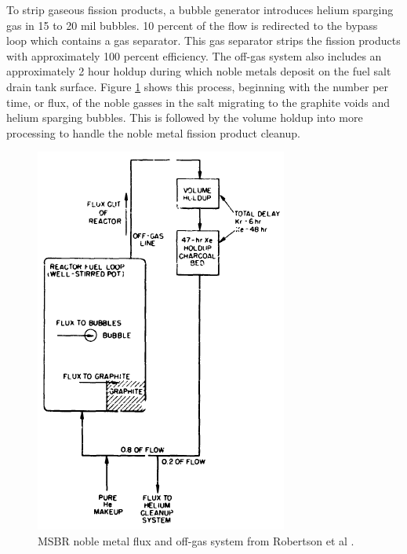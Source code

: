 To strip gaseous fission products, a bubble generator introduces helium sparging gas in 15 to 20 mil bubbles. 10 percent of the flow is redirected to the bypass loop which contains a gas separator. This gas separator strips the fission products with approximately 100 percent efficiency. The off-gas system also includes an approximately 2 hour holdup during which noble metals deposit on the fuel salt drain tank surface. Figure \ref{fig:msbr_nm_pa} shows this process, beginning with the number per time, or flux, of the noble gasses in the salt migrating to the graphite voids and helium sparging bubbles. This is followed by the volume holdup into more processing to handle the noble metal fission product cleanup.

\begin{figure}[H]
  \centering
  \includegraphics[scale=0.65]{images/msbr_nm_robertson.PNG}
  \caption{MSBR noble metal flux and off-gas system from Robertson et al \cite{robertson_conceptual_1971}.}
   \label{fig:msbr_nm_pa}
\end{figure}




